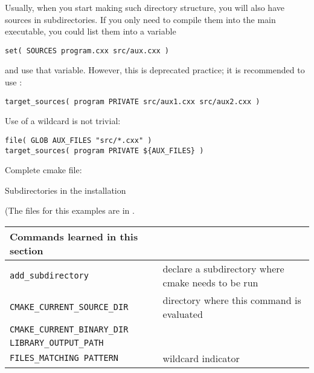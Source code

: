 \begin{floatingfigure}[r]{2.5in}\vskip3in\end{floatingfigure}
%
Usually, when you start making such directory structure,
you will also have sources in subdirectories.
If you only need to compile them into the main executable,
you could list them into a variable
\begin{lstlisting}
set( SOURCES program.cxx src/aux.cxx )
\end{lstlisting}
and use that variable.
However, this is deprecated practice;
it is recommended to use :
\begin{lstlisting}
target_sources( program PRIVATE src/aux1.cxx src/aux2.cxx )
\end{lstlisting}
Use of a wildcard is not trivial:
\begin{lstlisting}
file( GLOB AUX_FILES "src/*.cxx" )
target_sources( program PRIVATE ${AUX_FILES} )
\end{lstlisting}

Complete cmake file:
%


\newpage
{} {Subdirectories in the installation}
\label{sec:cmake-install-dirs}
\label{sec:cmake-rpath}

(The files for this examples are in .

\begin{tabular}{lp{3in}}
  \toprule
  Commands learned in this section\\
  \midrule
  \lstinline+add_subdirectory+&declare a subdirectory where cmake needs to be run\\
  \lstinline+CMAKE_CURRENT_SOURCE_DIR+&directory where this command is evaluated\\
  \lstinline+CMAKE_CURRENT_BINARY_DIR+&\\
  \lstinline+LIBRARY_OUTPUT_PATH+&\\
  \lstinline+FILES_MATCHING PATTERN+&wildcard indicator\\
  \bottomrule
\end{tabular}

